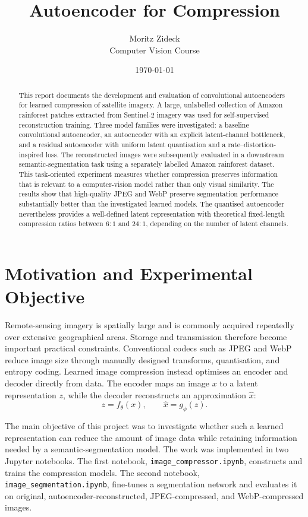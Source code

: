 \documentclass[10pt,a4paper]{article}
\title{\textbf{Autoencoder for Compression}}
\author{Moritz Zideck\\Computer Vision Course}
\date{\today}
\begin{document}
\maketitle

\begin{abstract}
This report documents the development and evaluation of convolutional
autoencoders for learned compression of satellite imagery. A large,
unlabelled collection of Amazon rainforest patches extracted from Sentinel-2
imagery was used for self-supervised reconstruction training. Three model
families were investigated: a baseline convolutional autoencoder, an
autoencoder with an explicit latent-channel bottleneck, and a residual
autoencoder with uniform latent quantisation and a rate--distortion-inspired
loss. The reconstructed images were subsequently evaluated in a downstream
semantic-segmentation task using a separately labelled Amazon rainforest
dataset. This task-oriented experiment measures whether compression preserves
information that is relevant to a computer-vision model rather than only
visual similarity. The results show that high-quality JPEG and WebP preserve
segmentation performance substantially better than the investigated learned
models. The quantised autoencoder nevertheless provides a well-defined latent
representation with theoretical fixed-length compression ratios between
\(6{:}1\) and \(24{:}1\), depending on the number of latent channels.
\end{abstract}

\section{Motivation and Experimental Objective}

Remote-sensing imagery is spatially large and is commonly acquired repeatedly
over extensive geographical areas. Storage and transmission therefore become
important practical constraints. Conventional codecs such as JPEG and WebP
reduce image size through manually designed transforms, quantisation, and
entropy coding. Learned image compression instead optimises an encoder and
decoder directly from data. The encoder maps an image \(x\) to a latent
representation \(z\), while the decoder reconstructs an approximation
\(\hat{x}\):
\begin{equation}
    z = f_{\theta}(x), \qquad
    \hat{x} = g_{\phi}(z).
\end{equation}

The main objective of this project was to investigate whether such a learned
representation can reduce the amount of image data while retaining information
needed by a semantic-segmentation model. The work was implemented in two
Jupyter notebooks. The first notebook, \texttt{image\_compressor.ipynb},
constructs and trains the compression models. The second notebook,
\texttt{image\_segmentation.ipynb}, fine-tunes a segmentation network and
evaluates it on original, autoencoder-reconstructed, JPEG-compressed, and
WebP-compressed images.
\end{document}
